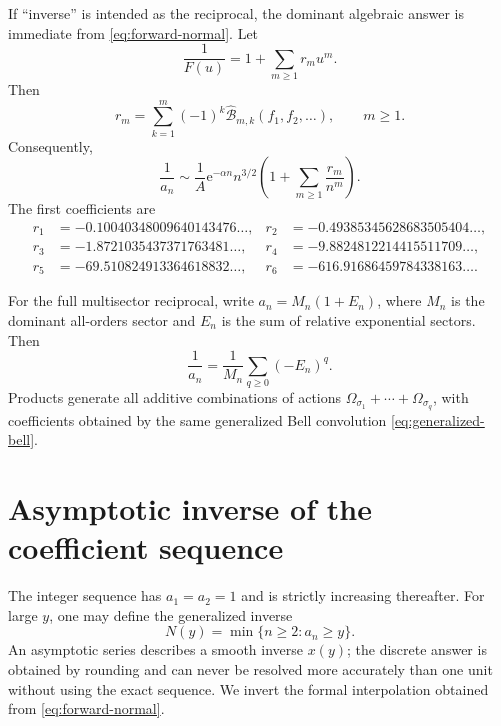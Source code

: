 \documentclass[11pt]{article}
\theoremstyle{definition}
\theoremstyle{remark}
\newcommand{\Bell}{\widehat{\mathcal B}}
\newcommand{\e}{\mathrm e}
\begin{document}
If ``inverse'' is intended as the reciprocal, the dominant algebraic answer
is immediate from \cref{eq:forward-normal}.  Let
\begin{equation}
 \frac1{F(u)}=1+\sum_{m\geq1}r_mu^m.
 \label{eq:reciprocal-F}
\end{equation}
Then
\begin{equation}
 \boxed{
 r_m=\sum_{k=1}^m(-1)^k\Bell_{m,k}(f_1,f_2,\ldots),
 \qquad m\geq1.}
 \label{eq:r-master}
\end{equation}
Consequently,
\begin{equation}
 \boxed{
 \frac1{a_n}
 \sim \frac1A\e^{-\alpha n}n^{3/2}
 \left(1+\sum_{m\geq1}\frac{r_m}{n^m}\right).}
 \label{eq:reciprocal-asymptotic}
\end{equation}
The first coefficients are
\begin{align*}
 r_1&=-0.10040348009640143476\ldots,&
 r_2&=-0.49385345628683505404\ldots,\\
 r_3&=-1.8721035437371763481\ldots,&
 r_4&=-9.8824812214415511709\ldots,\\
 r_5&=-69.510824913364618832\ldots,&
 r_6&=-616.91686459784338163\ldots.
\end{align*}

For the full multisector reciprocal, write
$a_n=M_n(1+E_n)$, where $M_n$ is the dominant all-orders sector and $E_n$ is
the sum of relative exponential sectors.  Then
\begin{equation}
 \frac1{a_n}=\frac1{M_n}\sum_{q\geq0}(-E_n)^q.
 \label{eq:reciprocal-multisector}
\end{equation}
Products generate all additive combinations of actions
$\Omega_{\sigma_1}+\cdots+\Omega_{\sigma_q}$, with coefficients obtained by
the same generalized Bell convolution \cref{eq:generalized-bell}.

\section{Asymptotic inverse of the coefficient sequence}
\label{sec:inverse}

The integer sequence has $a_1=a_2=1$ and is strictly increasing thereafter.
For large $y$, one may define the generalized inverse
\begin{equation}
 N(y)=\min\{n\geq2:a_n\geq y\}.
 \label{eq:integer-inverse}
\end{equation}
An asymptotic series describes a smooth inverse $x(y)$; the discrete answer is
obtained by rounding and can never be resolved more accurately than one unit
without using the exact sequence.  We invert the formal interpolation
obtained from \cref{eq:forward-normal}.
\end{document}
